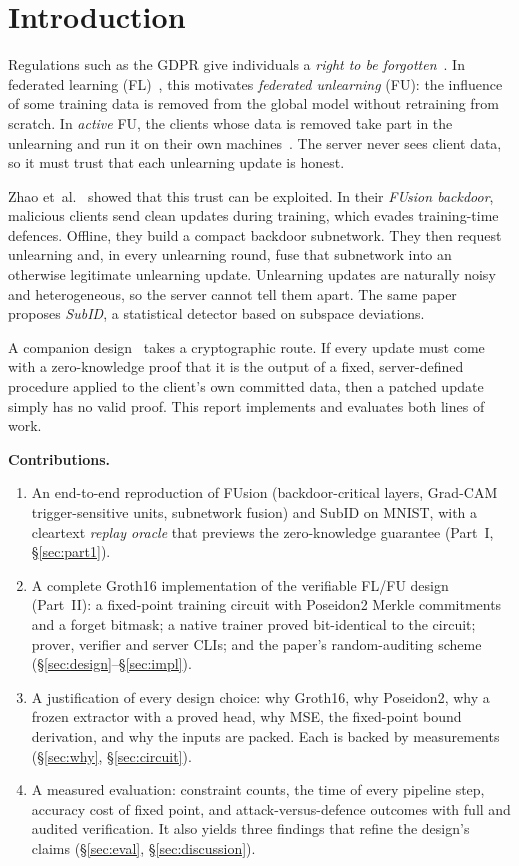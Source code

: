 \documentclass[conference]{IEEEtran}
\begin{document}
\section{Introduction}
Regulations such as the GDPR give individuals a \emph{right to be forgotten}~\cite{gdpr}. In federated
learning (FL)~\cite{fedavg}, this motivates \emph{federated unlearning} (FU): the influence of some
training data is removed from the global model without retraining from scratch. In \emph{active}
FU, the clients whose data is removed take part in the unlearning and run it on their own
machines~\cite{fusion}. The server never sees client data, so it must trust that each unlearning
update is honest.

Zhao et~al.~\cite{fusion} showed that this trust can be exploited. In their \emph{FUsion backdoor},
malicious clients send clean updates during training, which evades training-time defences. Offline,
they build a compact backdoor subnetwork. They then request unlearning and, in every unlearning
round, fuse that subnetwork into an otherwise legitimate unlearning update. Unlearning updates are
naturally noisy and heterogeneous, so the server cannot tell them apart. The same paper proposes
\emph{SubID}, a statistical detector based on subspace deviations.

A companion design~\cite{zkdesign} takes a cryptographic route. If every update must come with a
zero-knowledge proof that it is the output of a fixed, server-defined procedure applied to the
client's own committed data, then a patched update simply has no valid proof. This report
implements and evaluates both lines of work.

\textbf{Contributions.}
\begin{enumerate}
\item An end-to-end reproduction of FUsion (backdoor-critical layers, Grad-CAM trigger-sensitive
units, subnetwork fusion) and SubID on MNIST, with a cleartext \emph{replay oracle} that previews
the zero-knowledge guarantee (Part~I, \S\ref{sec:part1}).
\item A complete Groth16 implementation of the verifiable FL/FU design (Part~II): a fixed-point
training circuit with Poseidon2 Merkle commitments and a forget bitmask; a native trainer proved
bit-identical to the circuit; prover, verifier and server CLIs; and the paper's random-auditing
scheme (\S\ref{sec:design}--\S\ref{sec:impl}).
\item A justification of every design choice: why Groth16, why Poseidon2, why a frozen extractor
with a proved head, why MSE, the fixed-point bound derivation, and why the inputs are packed. Each
is backed by measurements (\S\ref{sec:why}, \S\ref{sec:circuit}).
\item A measured evaluation: constraint counts, the time of every pipeline step, accuracy cost of
fixed point, and attack-versus-defence outcomes with full and audited verification. It also yields
three findings that refine the design's claims (\S\ref{sec:eval}, \S\ref{sec:discussion}).
\end{enumerate}
\end{document}
